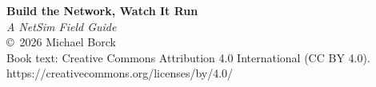 \thispagestyle{empty}
\vspace*{2in}
\begin{center}
\textbf{\large Build the Network, Watch It Run}\\[0.3em]
\textit{A NetSim Field Guide}\\[1em]
\copyright\ 2026 Michael Borck\\[0.5em]
Book text: Creative Commons Attribution 4.0 International (CC BY 4.0).\\
https://creativecommons.org/licenses/by/4.0/\\[1em]
\end{center}
\clearpage
